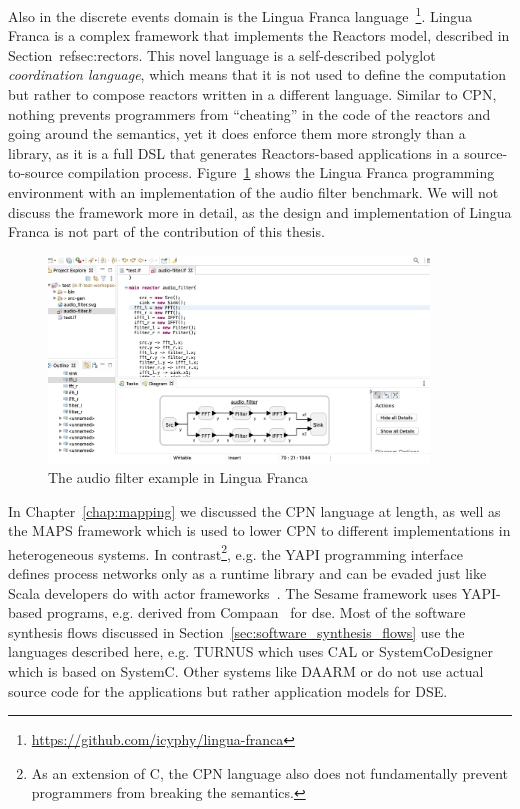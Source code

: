 Also in the discrete events domain is the Lingua Franca language~\cite{lohstroh_fdl20}\footnote{\url{https://github.com/icyphy/lingua-franca}}. 
Lingua Franca is a complex framework that implements the Reactors model, described in Section~ref{sec:rectors}.
This novel language is a self-described polyglot \emph{coordination language}, which means that it is not used to define the computation but rather to compose reactors written in a different language.
Similar to \ac{CPN}, nothing prevents programmers from ``cheating'' in the code of the reactors and going around the semantics, yet it does enforce them more strongly than a library, as it is a full \ac{DSL} that generates Reactors-based applications in a source-to-source compilation process.
Figure~\ref{fig:audio_filter_lf} shows the Lingua Franca programming environment with an implementation of the audio filter benchmark.
We will not discuss the framework more in detail, as the design and implementation of Lingua Franca is not part of the contribution of this thesis.

\begin{figure}[t]
	\centering
	\includegraphics[width=0.9\textwidth]{figures/audio_filter_lf_screenshot.png}
	\caption{The audio filter example in Lingua Franca}
	\label{fig:audio_filter_lf}
\end{figure}

In Chapter~\ref{chap:mapping} we discussed the \ac{CPN} language at length, as well as the \ac{MAPS} framework which is used to lower \ac{CPN} to different implementations in heterogeneous systems.
In contrast\footnote{As an extension of C, the \ac{CPN} language also does not fundamentally prevent programmers from breaking the semantics.}, e.g. the YAPI programming interface~\cite{yapi} defines process networks only as a runtime library and can be evaded just like Scala developers do with actor frameworks~\cite{tasharofi2013scala}.
The Sesame framework uses YAPI-based programs, e.g. derived from Compaan~\cite{stefanov2003deriving} for \ac{dse}\cite{pimentel2006systematic}.
Most of the software synthesis flows discussed in Section~\ref{sec:software_synthesis_flows} use the languages described here, e.g. TURNUS which uses CAL or SystemCoDesigner which is based on SystemC.
Other systems like DAARM or \mocasin do not use actual source code for the applications but rather application models for \ac{DSE}.


